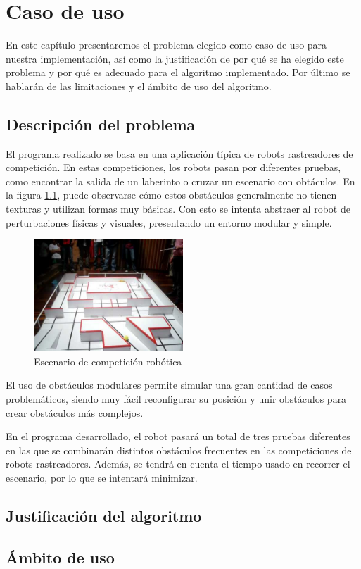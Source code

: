 \chapter{Caso de uso}
\label{caso_de_uso}

En este capítulo presentaremos el problema elegido como caso de uso para nuestra implementación, así como la justificación de por qué se ha elegido este problema y por qué es adecuado para el algoritmo implementado. Por último se hablarán de las limitaciones y el ámbito de uso del algoritmo.\\


\section{Descripción del problema}
\label{problema}

El programa realizado se basa en una aplicación típica de robots rastreadores de competición. En estas competiciones, los robots pasan por diferentes pruebas, como encontrar la salida de un laberinto o cruzar un escenario con obtáculos. En la figura \ref{fig:competi1}, puede observarse cómo estos obstáculos generalmente no tienen texturas y utilizan formas muy básicas. Con esto se intenta abstraer al robot de perturbaciones físicas y visuales, presentando un entorno modular y simple.

\begin{figure}[h]
		\centering
        \includegraphics[width=0.5\textwidth]{images/competi1.jpg}
        \caption{Escenario de competición robótica}
        \label{fig:competi1}
\end{figure}  

El uso de obstáculos modulares permite simular una gran cantidad de casos problemáticos, siendo muy fácil reconfigurar su posición y unir obstáculos para crear obstáculos más complejos.

En el programa desarrollado, el robot pasará un total de tres pruebas diferentes en las que se combinarán distintos obstáculos frecuentes en las competiciones de robots rastreadores. Además, se tendrá en cuenta el tiempo usado en recorrer el escenario, por lo que se intentará minimizar.



\section{Justificación del algoritmo}
\label{justificacion}




\section{Ámbito de uso}
\label{ambito}

